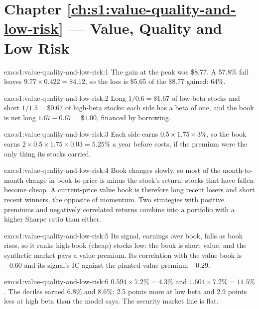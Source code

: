 \section*{Chapter \ref{ch:s1:value-quality-and-low-risk} --- Value, Quality and Low Risk}

\begin{solution}{exo:s1:value-quality-and-low-risk:1}
The gain at the peak was \$8.77. A 57.8\% fall leaves $9.77 \times 0.422 = \$4.12$, so the loss is \$5.65 of the \$8.77 gained: 64\%.
\end{solution}

\begin{solution}{exo:s1:value-quality-and-low-risk:2}
Long $1/0.6 = \$1.67$ of low-beta stocks and short $1/1.5 = \$0.67$ of high-beta stocks: each side has a beta of one, and the book is net long
$1.67 - 0.67 = \$1.00$, financed by borrowing.
\end{solution}

\begin{solution}{exo:s1:value-quality-and-low-risk:3}
Each side earns $0.5 \times 1.75 \times 3\%$, so the book earns $2 \times 0.5 \times 1.75 \times 0.03 = 5.25\%$ a year before costs, if the premium
were the only thing its stocks carried.
\end{solution}

\begin{solution}{exo:s1:value-quality-and-low-risk:4}
Book changes slowly, so most of the month-to-month change in book-to-price is minus the stock's return: stocks that have fallen become cheap. A current-price
value book is therefore long recent losers and short recent winners, the opposite of momentum. Two strategies with positive premiums and negatively
correlated returns combine into a portfolio with a higher Sharpe ratio than either.
\end{solution}

\begin{solution}{exo:s1:value-quality-and-low-risk:5}
Its signal, earnings over book, falls as book rises, so it ranks high-book (cheap) stocks low: the book is short value, and the synthetic market pays a value
premium. Its correlation with the value book is $-0.60$ and its signal's IC against the planted value premium $-0.29$.
\end{solution}

\begin{solution}{exo:s1:value-quality-and-low-risk:6}
$0.594 \times 7.2\% = 4.3\%$ and $1.604 \times 7.2\% = 11.5\%$. The deciles earned 6.8\% and 8.6\%: 2.5 points more at low beta and 2.9 points less at high
beta than the model says. The security market line is flat.
\end{solution}

